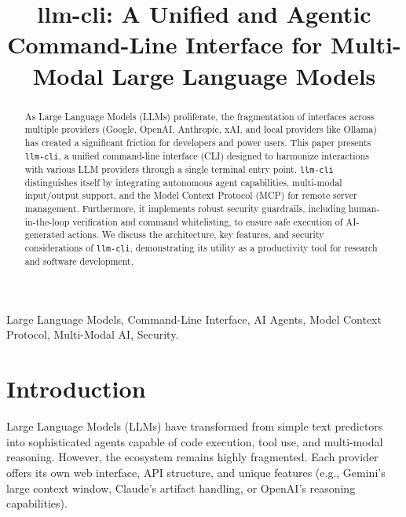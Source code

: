 \documentclass[conference]{IEEEtran}
\begin{document}
\title{llm-cli: A Unified and Agentic Command-Line Interface for Multi-Modal Large Language Models}

\author{
}

\maketitle

\begin{abstract}
As Large Language Models (LLMs) proliferate, the fragmentation of interfaces across multiple providers (Google, OpenAI, Anthropic, xAI, and local providers like Ollama) has created a significant friction for developers and power users. This paper presents \texttt{llm-cli}, a unified command-line interface (CLI) designed to harmonize interactions with various LLM providers through a single terminal entry point. \texttt{llm-cli} distinguishes itself by integrating autonomous agent capabilities, multi-modal input/output support, and the Model Context Protocol (MCP) for remote server management. Furthermore, it implements robust security guardrails, including human-in-the-loop verification and command whitelisting, to ensure safe execution of AI-generated actions. We discuss the architecture, key features, and security considerations of \texttt{llm-cli}, demonstrating its utility as a productivity tool for research and software development.
\end{abstract}

\begin{IEEEkeywords}
Large Language Models, Command-Line Interface, AI Agents, Model Context Protocol, Multi-Modal AI, Security.
\end{IEEEkeywords}

\section{Introduction}
Large Language Models (LLMs) have transformed from simple text predictors into sophisticated agents capable of code execution, tool use, and multi-modal reasoning. However, the ecosystem remains highly fragmented. Each provider offers its own web interface, API structure, and unique features (e.g., Gemini's large context window, Claude's artifact handling, or OpenAI's reasoning capabilities).
\end{document}
